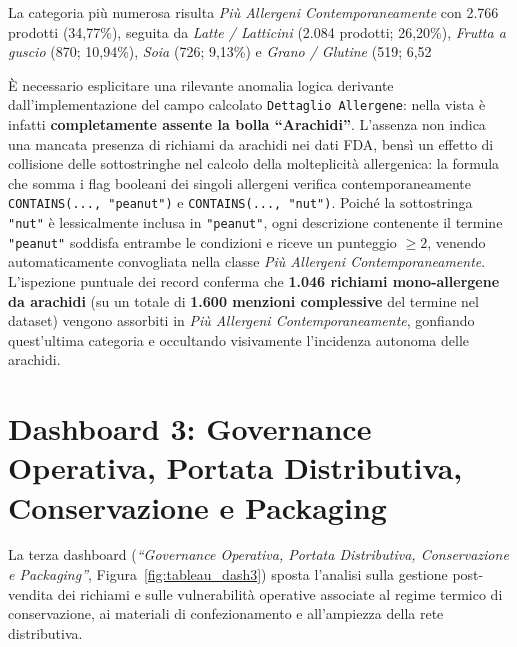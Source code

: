 La categoria più numerosa risulta \textit{Più Allergeni Contemporaneamente} con 2.766 prodotti (34,77\%), seguita da \textit{Latte / Latticini} (2.084 prodotti; 26,20\%), \textit{Frutta a guscio} (870; 10,94\%), \textit{Soia} (726; 9,13\%) e \textit{Grano / Glutine} (519; 6,52%

È necessario esplicitare una rilevante anomalia logica derivante dall'implementazione del campo calcolato \texttt{Dettaglio Allergene}: nella vista è infatti \textbf{completamente assente la bolla ``Arachidi''}. L'assenza non indica una mancata presenza di richiami da arachidi nei dati FDA, bensì un effetto di collisione delle sottostringhe nel calcolo della molteplicità allergenica: la formula che somma i flag booleani dei singoli allergeni verifica contemporaneamente \texttt{CONTAINS(..., "peanut")} e \texttt{CONTAINS(..., "nut")}. Poiché la sottostringa \texttt{"nut"} è lessicalmente inclusa in \texttt{"peanut"}, ogni descrizione contenente il termine \texttt{"peanut"} soddisfa entrambe le condizioni e riceve un punteggio $\ge 2$, venendo automaticamente convogliata nella classe \textit{Più Allergeni Contemporaneamente}. L'ispezione puntuale dei record conferma che \textbf{1.046 richiami mono-allergene da arachidi} (su un totale di \textbf{1.600 menzioni complessive} del termine nel dataset) vengono assorbiti in \textit{Più Allergeni Contemporaneamente}, gonfiando quest'ultima categoria e occultando visivamente l'incidenza autonoma delle arachidi.


\section{Dashboard 3: Governance Operativa, Portata Distributiva, Conservazione e Packaging}
\label{sec:tableau_dash3}

La terza dashboard (\textit{``Governance Operativa, Portata Distributiva, Conservazione e Packaging''}, Figura~\ref{fig:tableau_dash3}) sposta l'analisi sulla gestione post-vendita dei richiami e sulle vulnerabilità operative associate al regime termico di conservazione, ai materiali di confezionamento e all'ampiezza della rete distributiva.

